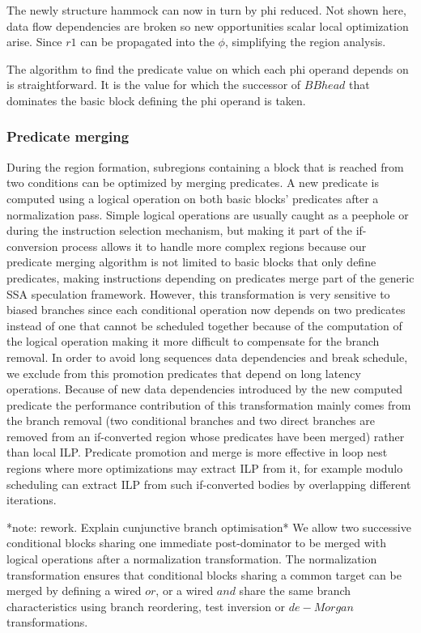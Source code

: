 The newly structure hammock can now in turn by phi reduced. Not shown here, data flow dependencies are broken so new opportunities scalar local optimization arise. Since $r1$ can be propagated into the $\phi$, simplifying the region analysis.


The algorithm to find the predicate value on which each phi operand depends on is straightforward. It is the value for which the successor of $BBhead$ that dominates the basic block defining the phi operand is taken.

\subsubsection{Predicate merging}

During the region formation, subregions containing a block that is reached from two conditions can be optimized by merging predicates. A new predicate is computed using a logical operation on both basic blocks' predicates after a normalization pass. Simple logical operations are usually caught as a peephole or during the instruction selection mechanism, but making it part of the if-conversion process allows it to handle more complex regions because our predicate merging algorithm is not limited to basic blocks that only define predicates, making instructions depending on predicates merge part of the generic SSA speculation framework. However, this transformation is very sensitive to biased branches since each conditional operation now depends on two predicates instead of one that cannot be scheduled together because of the computation of the logical operation making it more difficult to compensate for the branch removal. In order to avoid long sequences data dependencies and break schedule, we exclude from this promotion predicates that depend on long latency operations.
Because of new data dependencies introduced by the new computed predicate the performance contribution of this transformation mainly comes from the branch removal (two conditional branches and two direct branches are removed from an if-converted region whose predicates have been merged) rather than local ILP. Predicate promotion and merge is more effective in loop nest regions where more optimizations may extract ILP from it, for example modulo scheduling can extract ILP from such if-converted bodies by overlapping different iterations. 

*note: rework. Explain cunjunctive branch optimisation*
We allow two successive conditional blocks sharing one immediate post-dominator to be merged with logical operations after a normalization transformation. The normalization transformation ensures that conditional blocks sharing a common target can be merged by defining a wired $or$, or a wired $and$ share the same branch characteristics using branch reordering, test inversion or $de-Morgan$ transformations.

